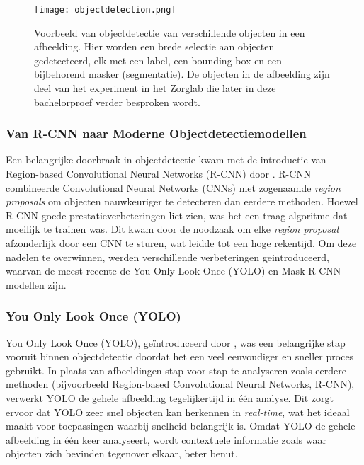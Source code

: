 \begin{figure}[H]
  \centering
  \texttt{[image: objectdetection.png]}
  \caption[]{\label{fig:object-detection}
  Voorbeeld van objectdetectie van verschillende objecten in een afbeelding. 
  Hier worden een brede selectie aan objecten gedetecteerd, elk met een label, een bounding box en een bijbehorend masker (segmentatie).
  De objecten in de afbeelding zijn deel van het experiment in het Zorglab die later in deze bachelorproef verder besproken wordt.
  }
\end{figure}

\subsubsection{Van R-CNN naar Moderne Objectdetectiemodellen}

Een belangrijke doorbraak in objectdetectie kwam met de introductie van Region-based Convolutional Neural Networks (R-CNN) door \textcite{Girshick2014}.
R-CNN combineerde Convolutional Neural Networks (CNNs) met zogenaamde \textit{region proposals} om objecten nauwkeuriger te detecteren dan eerdere methoden.
Hoewel R-CNN goede prestatieverbeteringen liet zien, was het een traag algoritme dat moeilijk te trainen was. 
Dit kwam door de noodzaak om elke \textit{region proposal} afzonderlijk door een CNN te sturen, wat leidde tot een hoge rekentijd.
Om deze nadelen te overwinnen, werden verschillende verbeteringen geintroduceerd, waarvan de meest recente de You Only Look Once (YOLO) en Mask R-CNN modellen zijn.

\subsubsection{You Only Look Once (YOLO)}
\label{sec:yolo}

You Only Look Once (YOLO), geïntroduceerd door \textcite{Redmon2016}, was een belangrijke stap vooruit binnen objectdetectie doordat het een veel eenvoudiger en sneller proces gebruikt. 
In plaats van afbeeldingen stap voor stap te analyseren zoals eerdere methoden (bijvoorbeeld Region-based Convolutional Neural Networks, R-CNN), verwerkt YOLO de gehele afbeelding tegelijkertijd in één analyse. 
Dit zorgt ervoor dat YOLO zeer snel objecten kan herkennen in \textit{real-time}, wat het ideaal maakt voor toepassingen waarbij snelheid belangrijk is.
Omdat YOLO de gehele afbeelding in één keer analyseert, wordt contextuele informatie zoals waar objecten zich bevinden tegenover elkaar, beter benut.

